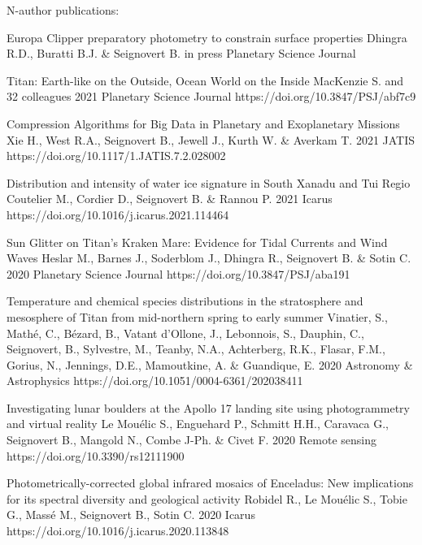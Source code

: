 \begin{cvpublications}{N-author publications:}

	{Europa Clipper preparatory photometry to constrain surface properties}
	{Dhingra R.D., Buratti B.J. \& Seignovert B.}
    {in press}
	{Planetary Science Journal}
    {}

	{Titan: Earth-like on the Outside, Ocean World on the Inside}
	{MacKenzie S. and 32 colleagues}
    {2021}
	{Planetary Science Journal}
    {https://doi.org/10.3847/PSJ/abf7c9}

	{Compression Algorithms for Big Data in Planetary and Exoplanetary Missions}
	{Xie H., West R.A., Seignovert B., Jewell J., Kurth W. \& Averkam T.}
    {2021}
	{JATIS}
    {https://doi.org/10.1117/1.JATIS.7.2.028002}

	{Distribution and intensity of water ice signature in South Xanadu and Tui Regio}
	{Coutelier M., Cordier D., Seignovert B. \& Rannou P.}
    {2021}
	{Icarus}
    {https://doi.org/10.1016/j.icarus.2021.114464}

	{Sun Glitter on Titan's Kraken Mare: Evidence for Tidal Currents and Wind Waves}
	{Heslar M., Barnes J., Soderblom J., Dhingra R., Seignovert B. \& Sotin C.}
	{2020}
    {Planetary Science Journal}
    {https://doi.org/10.3847/PSJ/aba191}

	{Temperature and chemical species distributions in the stratosphere and mesosphere of Titan from mid-northern spring to early summer}
	{Vinatier, S., Mathé, C., Bézard, B., Vatant d’Ollone, J., Lebonnois, S., Dauphin, C., Seignovert, B., Sylvestre, M., Teanby, N.A., Achterberg, R.K., Flasar, F.M., Gorius, N., Jennings, D.E., Mamoutkine, A. \& Guandique, E.}
    {2020}
	{Astronomy \& Astrophysics}
    {https://doi.org/10.1051/0004-6361/202038411}

	{Investigating lunar boulders at the Apollo 17 landing site using photogrammetry and virtual reality}
	{Le Mouélic S., Enguehard P., Schmitt H.H., Caravaca G., Seignovert B., Mangold N., Combe J-Ph. \& Civet F.}
	{2020}
    {Remote sensing}
    {https://doi.org/10.3390/rs12111900}

	{Photometrically-corrected global infrared mosaics of Enceladus: New implications for its spectral diversity and geological activity}
	{Robidel R., Le Mouélic S., Tobie  G., Massé M., Seignovert B., Sotin C.}
	{2020}
    {Icarus}
    {https://doi.org/10.1016/j.icarus.2020.113848}


\end{cvpublications}
